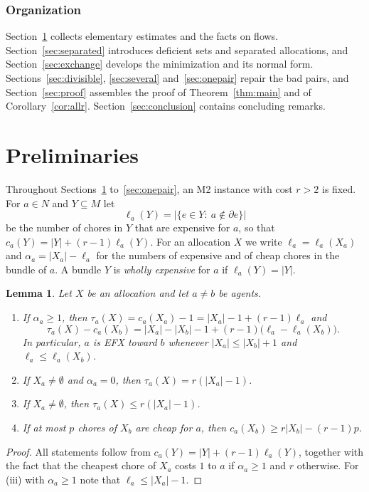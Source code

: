 \documentclass{amsart}
\numberwithin{equation}{section}
\newtheorem{lemma}[theorem]{Lemma}
\theoremstyle{definition}
\theoremstyle{remark}
\newcommand{\bd}{\partial}
\begin{document}
\subsubsection*{Organization}
Section~\ref{sec:prelim} collects elementary estimates and the facts on flows. Section~\ref{sec:separated} introduces deficient sets and separated allocations, and Section~\ref{sec:exchange} develops the minimization and its normal form. Sections~\ref{sec:divisible}, \ref{sec:several} and~\ref{sec:onepair} repair the bad pairs, and Section~\ref{sec:proof} assembles the proof of Theorem~\ref{thm:main} and of Corollary~\ref{cor:allr}. Section~\ref{sec:conclusion} contains concluding remarks.

\section{Preliminaries}\label{sec:prelim}

Throughout Sections~\ref{sec:prelim} to~\ref{sec:onepair}, an M2 instance with cost $r>2$ is fixed. For $a\in N$ and $Y\subseteq M$ let
\[
\ell_a(Y)=|\{e\in Y:\ a\notin\bd e\}|
\]
be the number of chores in $Y$ that are expensive for $a$, so that $c_a(Y)=|Y|+(r-1)\ell_a(Y)$. For an allocation $X$ we write $\ell_a=\ell_a(X_a)$ and $\alpha_a=|X_a|-\ell_a$ for the numbers of expensive and of cheap chores in the bundle of $a$. A bundle $Y$ is \emph{wholly expensive} for $a$ if $\ell_a(Y)=|Y|$.

\begin{lemma}\label{lem:basic}
Let $X$ be an allocation and let $a\ne b$ be agents.
\begin{enumerate}[label=\textup{(\roman*)}]
\item If $\alpha_a\ge 1$, then $\tau_a(X)=c_a(X_a)-1=|X_a|-1+(r-1)\ell_a$ and
\[
\tau_a(X)-c_a(X_b)=|X_a|-|X_b|-1+(r-1)\bigl(\ell_a-\ell_a(X_b)\bigr).
\]
In particular, $a$ is EFX toward $b$ whenever $|X_a|\le |X_b|+1$ and $\ell_a\le\ell_a(X_b)$.
\item If $X_a\ne\emptyset$ and $\alpha_a=0$, then $\tau_a(X)=r(|X_a|-1)$.
\item If $X_a\ne\emptyset$, then $\tau_a(X)\le r(|X_a|-1)$.
\item If at most $p$ chores of $X_b$ are cheap for $a$, then $c_a(X_b)\ge r|X_b|-(r-1)p$.
\end{enumerate}
\end{lemma}

\begin{proof}
All statements follow from $c_a(Y)=|Y|+(r-1)\ell_a(Y)$, together with the fact that the cheapest chore of $X_a$ costs $1$ to $a$ if $\alpha_a\ge1$ and $r$ otherwise. For (iii) with $\alpha_a\ge1$ note that $\ell_a\le|X_a|-1$.
\end{proof}
\end{document}
